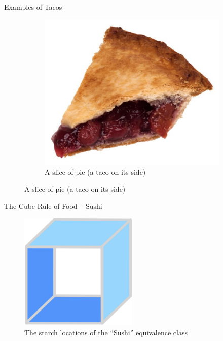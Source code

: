\documentclass{beamer}
\begin{document}
\begin{frame}{Examples of Tacos}
\begin{figure}
\begin{subfigure}{.5\textwidth}
          \centering
          \includegraphics[width=.6\linewidth]{images/cube_rule_of_food/taco/20_pie_slice.jpg}
          \caption{\label{fig:pie-slices}A slice of pie (a taco on its side)}
        \end{subfigure}
    \end{figure}
\end{frame}

\begin{frame}{The Cube Rule of Food -- Sushi}
    \begin{figure}
        \includegraphics[width=0.5\textwidth]{images/cube_rule_of_food/sushi/21_sushi.jpg}
        \caption{\label{fig:sushi-diagram}The starch locations of the ``Sushi'' equivalence class}
    \end{figure}
\end{frame}
\end{document}
